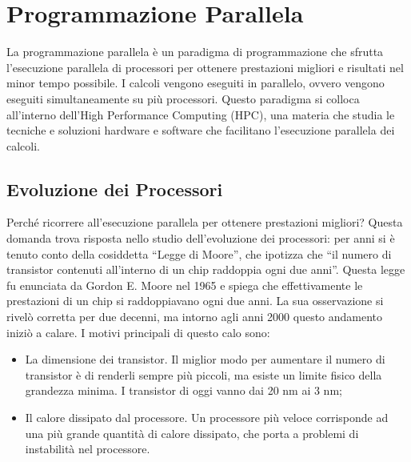\documentclass[12pt,a4paper,openright,twoside]{report}
\begin{document}
\rhead[\fancyplain{}{\bfseries\leftmark}]{\fancyplain{}{\bfseries\thepage}}
\clearpage{\pagestyle{empty}\cleardoublepage}
\clearpage{\pagestyle{empty}\cleardoublepage}
\chapter{Programmazione Parallela}

\lhead[\fancyplain{}{\bfseries\thepage}]{\fancyplain{}{\bfseries\rightmark}}

La programmazione parallela è un paradigma di programmazione che sfrutta l'esecuzione parallela di processori per ottenere prestazioni migliori e risultati nel minor tempo possibile. I calcoli vengono eseguiti in parallelo, ovvero vengono eseguiti simultaneamente su più processori. Questo paradigma si colloca all'interno dell'High Performance Computing (HPC), una materia che studia le tecniche e soluzioni hardware e software che facilitano l'esecuzione parallela dei calcoli.



\section{Evoluzione dei Processori}

Perché ricorrere all'esecuzione parallela per ottenere prestazioni migliori? Questa domanda trova risposta nello studio dell'evoluzione dei processori: per anni si è tenuto conto della cosiddetta ``Legge di Moore'', che ipotizza che ``il numero di transistor contenuti all'interno di un chip raddoppia ogni due anni''. Questa legge fu enunciata da Gordon E. Moore nel 1965 e spiega che effettivamente le prestazioni di un chip si raddoppiavano ogni due anni. La sua osservazione si rivelò corretta per due decenni, ma intorno agli anni 2000 questo andamento iniziò a calare. I motivi principali di questo calo sono:

\begin{itemize}
    \item La dimensione dei transistor. Il miglior modo per aumentare il numero di transistor è di renderli sempre più piccoli, ma esiste un limite fisico della grandezza minima. I transistor di oggi vanno dai 20 nm ai 3 nm;
    \item Il calore dissipato dal processore. Un processore più veloce corrisponde ad una più grande quantità di calore dissipato, che porta a problemi di instabilità nel processore.
\end{itemize}
\end{document}
